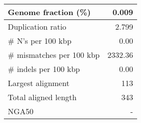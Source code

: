 \documentclass[12pt,a4paper]{article}
\begin{document}
\begin{table}[ht]
\begin{center}
\begin{tabular}{|l*{1}{|r}|}
Genome fraction (\%) & 0.009 \\ \hline
Duplication ratio & 2.799 \\ \hline
\# N's per 100 kbp & 0.00 \\ \hline
\# mismatches per 100 kbp & 2332.36 \\ \hline
\# indels per 100 kbp & 0.00 \\ \hline
Largest alignment & 113 \\ \hline
Total aligned length & 343 \\ \hline
NGA50 & - \\ \hline
\end{tabular}
\end{center}
\end{table}
\end{document}
